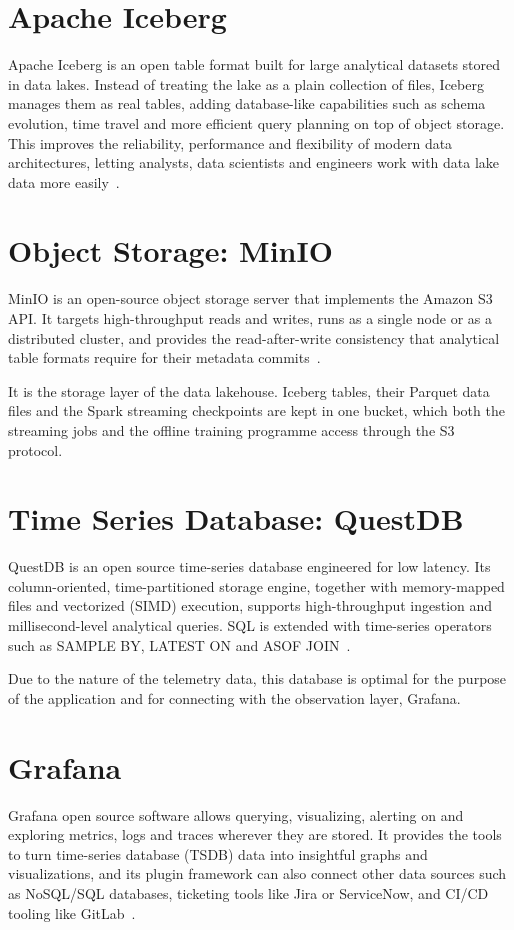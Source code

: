 \section{Apache Iceberg}
Apache Iceberg is an open table format built for large analytical datasets stored in data lakes. Instead of treating the lake as a plain collection of files, Iceberg manages them as real tables, adding database-like capabilities such as schema evolution, time travel and more efficient query planning on top of object storage. This improves the reliability, performance and flexibility of modern data architectures, letting analysts, data scientists and engineers work with data lake data more easily~\cite{apache_iceberg}.

\section{Object Storage: MinIO}
MinIO is an open-source object storage server that implements the Amazon S3 API. It targets high-throughput reads and writes, runs as a single node or as a distributed cluster, and provides the read-after-write consistency that analytical table formats require for their metadata commits~\cite{minio}.

It is the storage layer of the data lakehouse. Iceberg tables, their Parquet data files and the Spark streaming checkpoints are kept in one bucket, which both the streaming jobs and the offline training programme access through the S3 protocol.

\section{Time Series Database: QuestDB}
QuestDB is an open source time-series database engineered for low latency. Its column-oriented, time-partitioned storage engine, together with memory-mapped files and vectorized (SIMD) execution, supports high-throughput ingestion and millisecond-level analytical queries. SQL is extended with time-series operators such as SAMPLE BY, LATEST ON and ASOF JOIN~\cite{questdb}.

Due to the nature of the telemetry data, this database is optimal for the purpose of the application and for connecting with the observation layer, Grafana.

\section{Grafana}
Grafana open source software allows querying, visualizing, alerting on and exploring metrics, logs and traces wherever they are stored. It provides the tools to turn time-series database (TSDB) data into insightful graphs and visualizations, and its plugin framework can also connect other data sources such as NoSQL/SQL databases, ticketing tools like Jira or ServiceNow, and CI/CD tooling like GitLab~\cite{grafana}.

